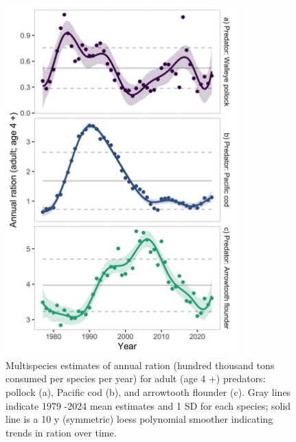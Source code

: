 \documentclass[
]{article}
\begin{document}
\begin{figure}
\centering
\includegraphics[width=0.8\textwidth,height=\textheight]{Results/ESR_Fig4.jpg}
\caption{Multispecies estimates of annual ration (hundred thousand tons
consumed per species per year) for adult (age 4 +) predators: pollock
(a), Pacific cod (b), and arrowtooth flounder (c). Gray lines indicate
1979 -2024 mean estimates and 1 SD for each species; solid line is a 10
y (symmetric) loess polynomial smoother indicating trends in ration over
time.}
\end{figure}
\end{document}
